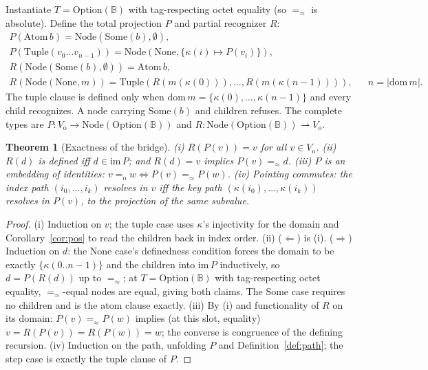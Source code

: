 \documentclass[11pt]{article}
\newtheorem{theorem}{Theorem}[section]
\theoremstyle{definition}
\newcommand{\Bytes}{\mathbb{B}}                    %
\newcommand{\NodeT}[1]{\mathrm{Node}(#1)}
\newcommand{\dom}{\mathrm{dom}\,}
\newcommand{\eqS}{=_{\approx}}                     %
\newcommand{\VO}{V_{\mathrm{o}}}                   %
\newcommand{\Atom}{\mathrm{Atom}}
\newcommand{\Tup}{\mathrm{Tuple}}
\newcommand{\eqO}{=_{\mathrm{o}}}
\begin{document}
Instantiate $T = \mathrm{Option}(\Bytes)$ with tag-respecting octet equality
(so $\eqS$ is absolute).
Define the total projection $P$ and partial recognizer $R$:
\[
\begin{array}{lcl}
P(\Atom\,b) = \mathrm{Node}(\mathrm{Some}(b),\emptyset), &&\\[2pt]
P(\Tup(v_0 \dots v_{n-1})) = \mathrm{Node}(\mathrm{None},\{\kappa(i) \mapsto P(v_i)\}), &&\\[3pt]
R(\mathrm{Node}(\mathrm{Some}(b),\emptyset)) = \Atom\,b, &&\\[2pt]
R(\mathrm{Node}(\mathrm{None},m)) = \Tup(R(m(\kappa(0))), \dots, R(m(\kappa(n{-}1)))), && n = |\dom m|.
\end{array}
\]
The tuple clause is defined only when $\dom m = \{\kappa(0), \dots, \kappa(n{-}1)\}$
and every child recognizes. A node carrying $\mathrm{Some}(b)$ and children refuses.
The complete types are $P : \VO\to\NodeT{\mathrm{Option}(\Bytes)}$ and
$R : \NodeT{\mathrm{Option}(\Bytes)}\rightharpoonup\VO$.

\begin{theorem}[Exactness of the bridge]\label{thm:ontos}
\emph{(i)} $R(P(v)) = v$ for all $v \in \VO$.
\emph{(ii)} $R(d)$ is defined iff $d \in \mathrm{im}\,P$; and $R(d) = v$ implies
$P(v) \eqS d$.
\emph{(iii)} $P$ is an embedding of identities:
$v \eqO w \iff P(v) \eqS P(w)$.
\emph{(iv)} Pointing commutes: the index path $(i_0, \dots, i_k)$ resolves in $v$ iff
the key path $(\kappa(i_0), \dots, \kappa(i_k))$ resolves in $P(v)$, to the
projection of the same subvalue.
\end{theorem}

\begin{proof}
(i) Induction on $v$; the tuple case uses $\kappa$'s injectivity for the domain and
Corollary~\ref{cor:pos} to read the children back in index order.
(ii) ($\Leftarrow$) is (i). ($\Rightarrow$) Induction on $d$: the $\mathrm{None}$ case's
definedness condition forces the domain to be exactly $\{\kappa(0..n{-}1)\}$ and the
children into $\mathrm{im}\,P$ inductively, so $d = P(R(d))$ up to $\eqS$; at
$T = \mathrm{Option}(\Bytes)$ with tag-respecting octet equality, $\eqS$-equal nodes
are equal, giving both claims. The $\mathrm{Some}$ case requires no children and
is the atom clause exactly.
(iii) By (i) and functionality of $R$ on its domain: $P(v) \eqS P(w)$ implies (at
this slot, equality) $v = R(P(v)) = R(P(w)) = w$; the converse is congruence of the
defining recursion.
(iv) Induction on the path, unfolding $P$ and Definition~\ref{def:path}; the step
case is exactly the tuple clause of $P$.
\end{proof}
\end{document}
